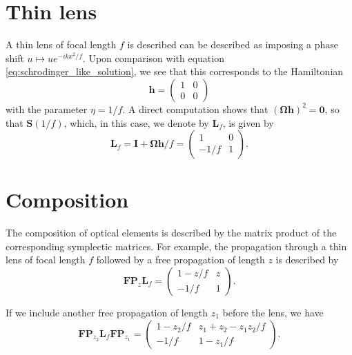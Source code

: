\documentclass[a4paper,10pt]{report}
\begin{document}
\section{Thin lens}

A thin lens of focal length $f$ is described can be described as imposing a phase shift $u \mapsto u e^{-ikx^2/f}$. Upon comparison with equation \eqref{eq:schrodinger_like_solution}, we see that this corresponds to the Hamiltonian
\begin{equation}
    \mathbf{h} = \begin{pmatrix}
        1 & 0 \\
        0 & 0
    \end{pmatrix}
\end{equation}
with the parameter $\eta = 1/f$. A direct computation shows that $(\boldsymbol{\Omega}\mathbf{h})^2 = \boldsymbol{0}$, so that $\mathbf{S}(1/f)$, which, in this case, we denote by $\mathbf{L}_f$, is given by
\begin{equation}
    \mathbf{L}_f = \boldsymbol{I} + \boldsymbol{\Omega}\mathbf{h} / f = \begin{pmatrix}
        1 & 0 \\
        -1/f & 1
    \end{pmatrix} .
\end{equation}

\section{Composition}

The composition of optical elements is described by the matrix product of the corresponding symplectic matrices. For example, the propagation through a thin lens of focal length $f$ followed by a free propagation of length $z$ is described by
\begin{equation}
    \mathbf{FP}_z \mathbf{L}_f = \begin{pmatrix}
        1 - z/f & z \\
        -1/f & 1
    \end{pmatrix} .
\end{equation}

If we include another free propagation of length $z_1$ before the lens, we have
\begin{equation}
    \mathbf{FP}_{z_2} \mathbf{L}_f \mathbf{FP}_{z_1} = \begin{pmatrix}
        1 - z_2/f & z_1 + z_2 - z_1 z_2 / f \\
        -1/f & 1 - z_1 / f
    \end{pmatrix} .
\end{equation}
\end{document}
